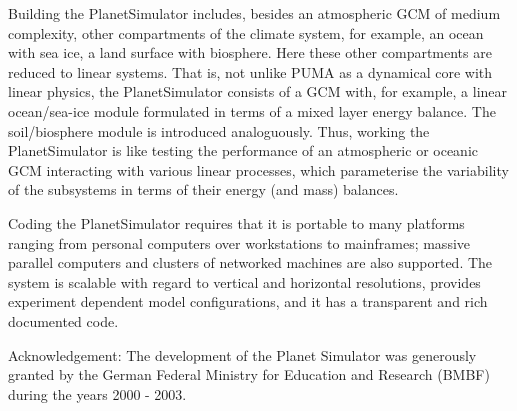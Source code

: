 Building the PlanetSimulator includes, besides an atmospheric
 GCM of medium complexity, other compartments of the climate
 system, for example, an ocean with sea ice, a land surface with
 biosphere. Here these other compartments are reduced to linear
 systems. That is, not unlike PUMA as a dynamical core with
 linear physics, the PlanetSimulator consists of a GCM with,
 for example, a linear ocean/sea-ice module formulated in
 terms of a mixed layer energy balance. The soil/biosphere
 module is introduced analoguously. Thus, working the PlanetSimulator
 is like testing the performance of an atmospheric or oceanic GCM
 interacting with various linear processes, which parameterise
 the variability of the subsystems in terms of their energy
 (and mass) balances.

Coding the PlanetSimulator requires that it is portable to many
 platforms ranging from  personal computers over workstations
 to mainframes; massive parallel computers and clusters of
 networked machines are also supported. The system is scalable
 with regard to vertical and horizontal resolutions, provides
 experiment dependent model configurations, and it has a transparent
  and rich documented code.

Acknowledgement: The development of the Planet Simulator
 was generously granted by the
 German Federal Ministry for Education and Research (BMBF)
 during the years 2000 - 2003.

